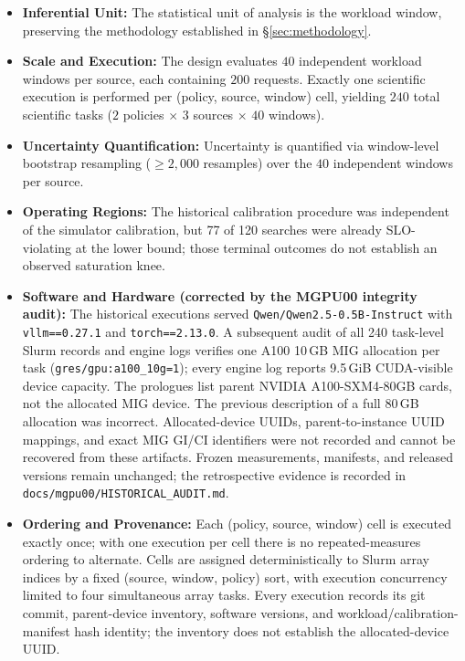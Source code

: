 \begin{itemize}
  \item \textbf{Inferential Unit:} The statistical unit of analysis is the workload window, preserving the methodology established in \S\ref{sec:methodology}.
  \item \textbf{Scale and Execution:} The design evaluates $40$ independent workload windows per source, each containing $200$ requests. Exactly one scientific execution is performed per (policy, source, window) cell, yielding $240$ total scientific tasks ($2$ policies $\times$ $3$ sources $\times$ $40$ windows).
  \item \textbf{Uncertainty Quantification:} Uncertainty is quantified via window-level bootstrap resampling ($\ge 2{,}000$ resamples) over the $40$ independent windows per source.
  \item \textbf{Operating Regions:} The historical calibration procedure was independent of the simulator calibration, but 77 of 120 searches were already SLO-violating at the lower bound; those terminal outcomes do not establish an observed saturation knee.
  \item \textbf{Software and Hardware (corrected by the MGPU00 integrity audit):} The historical executions served \texttt{Qwen/Qwen2.5-0.5B-Instruct} with \texttt{vllm==0.27.1} and \texttt{torch==2.13.0}. A subsequent audit of all 240 task-level Slurm records and engine logs verifies one A100 10\,GB MIG allocation per task (\texttt{gres/gpu:a100\_10g=1}); every engine log reports 9.5\,GiB CUDA-visible device capacity. The prologues list parent NVIDIA A100-SXM4-80GB cards, not the allocated MIG device. The previous description of a full 80\,GB allocation was incorrect. Allocated-device UUIDs, parent-to-instance UUID mappings, and exact MIG GI/CI identifiers were not recorded and cannot be recovered from these artifacts. Frozen measurements, manifests, and released versions remain unchanged; the retrospective evidence is recorded in \texttt{docs/mgpu00/HISTORICAL\_AUDIT.md}.
  \item \textbf{Ordering and Provenance:} Each (policy, source, window) cell is executed exactly once; with one execution per cell there is no repeated-measures ordering to alternate. Cells are assigned deterministically to Slurm array indices by a fixed (source, window, policy) sort, with execution concurrency limited to four simultaneous array tasks. Every execution records its git commit, parent-device inventory, software versions, and workload/calibration-manifest hash identity; the inventory does not establish the allocated-device UUID.
\end{itemize}


